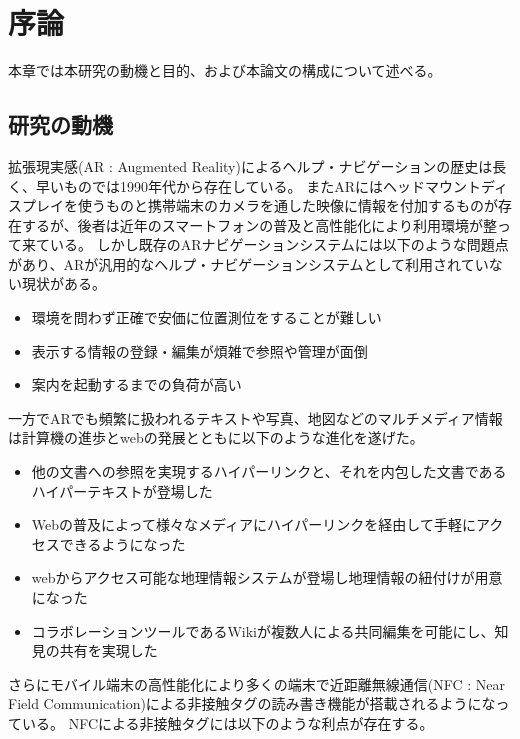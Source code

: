 \chapter{序論}
\label{chap:introduction}


本章では本研究の動機と目的、および本論文の構成について述べる。

\newpage


\section{研究の動機}
\label{motive}

拡張現実感(AR : Augmented Reality)によるヘルプ・ナビゲーションの歴史は長く、早いものでは1990年代から存在している。
またARにはヘッドマウントディスプレイを使うものと携帯端末のカメラを通した映像に情報を付加するものが存在するが、後者は近年のスマートフォンの普及と高性能化により利用環境が整って来ている。
しかし既存のARナビゲーションシステムには以下のような問題点があり、ARが汎用的なヘルプ・ナビゲーションシステムとして利用されていない現状がある。

\begin{itemize}
  \item 環境を問わず正確で安価に位置測位をすることが難しい
  \item 表示する情報の登録・編集が煩雑で参照や管理が面倒
  \item 案内を起動するまでの負荷が高い
\end{itemize}

一方でARでも頻繁に扱われるテキストや写真、地図などのマルチメディア情報は計算機の進歩とwebの発展とともに以下のような進化を遂げた。

\begin{itemize}
  \item 他の文書への参照を実現するハイパーリンクと、それを内包した文書であるハイパーテキストが登場した
  \item Webの普及によって様々なメディアにハイパーリンクを経由して手軽にアクセスできるようになった
  \item webからアクセス可能な地理情報システムが登場し地理情報の紐付けが用意になった
  \item コラボレーションツールであるWikiが複数人による共同編集を可能にし、知見の共有を実現した
\end{itemize}

さらにモバイル端末の高性能化により多くの端末で近距離無線通信(NFC : Near Field Communication)による非接触タグの読み書き機能が搭載されるようになっている。
NFCによる非接触タグには以下のような利点が存在する。

